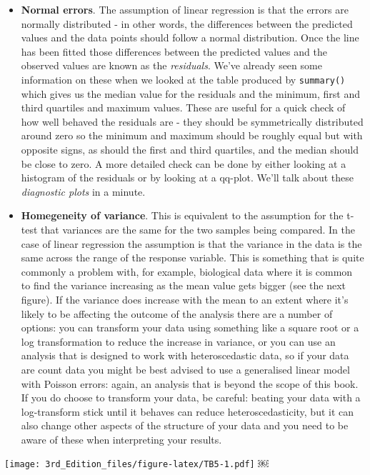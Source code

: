 \documentclass[
]{book}
\begin{document}
\begin{itemize}
\item
  \textbf{Normal errors}. The assumption of linear regression is that the errors are normally distributed - in other words, the differences between the predicted values and the data points should follow a normal distribution. Once the line has been fitted those differences between the predicted values and the observed values are known as the \emph{residuals}. We've already seen some information on these when we looked at the table produced by \texttt{summary()} which gives us the median value for the residuals and the minimum, first and third quartiles and maximum values. These are useful for a quick check of how well behaved the residuals are - they should be symmetrically distributed around zero so the minimum and maximum should be roughly equal but with opposite signs, as should the first and third quartiles, and the median should be close to zero. A more detailed check can be done by either looking at a histogram of the residuals or by looking at a qq-plot. We'll talk about these \emph{diagnostic plots} in a minute.
\item
  \textbf{Homegeneity of variance}. This is equivalent to the assumption for the t-test that variances are the same for the two samples being compared. In the case of linear regression the assumption is that the variance in the data is the same across the range of the response variable. This is something that is quite commonly a problem with, for example, biological data where it is common to find the variance increasing as the mean value gets bigger (see the next figure). If the variance does increase with the mean to an extent where it's likely to be affecting the outcome of the analysis there are a number of options: you can transform your data using something like a square root or a log transformation to reduce the increase in variance, or you can use an analysis that is designed to work with heteroscedastic data, so if your data are count data you might be best advised to use a generalised linear model with Poisson errors: again, an analysis that is beyond the scope of this book. If you do choose to transform your data, be careful: beating your data with a log-transform stick until it behaves can reduce heteroscedasticity, but it can also change other aspects of the structure of your data and you need to be aware of these when interpreting your results.
\end{itemize}

\texttt{[image: 3rd\_Edition\_files/figure-latex/TB5-1.pdf]}
￼
\end{document}
